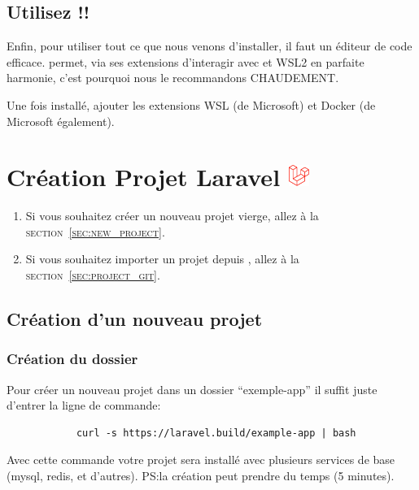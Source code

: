 \documentclass[internal]{nhitec_design}
\begin{document}
    \subsection[VS Code]{Utilisez \vscode!!}
    Enfin, pour utiliser tout ce que nous venons d'installer, il faut un éditeur de code efficace. \href{https://code.visualstudio.com/}{\vscode{}} permet, via ses extensions d'interagir avec \docker{} et WSL2 en parfaite harmonie, c'est pourquoi nous le recommandons CHAUDEMENT. 

    Une fois \vscode{} installé, ajouter les extensions WSL (de Microsoft) et Docker (de Microsoft également).





\newpage
\section[Création Projet Laravel]{Création Projet Laravel \includegraphics[height=20pt]{figures-logos/laravel.pdf}}

\begin{enumerate}
    \item Si vous souhaitez créer un nouveau projet vierge, allez à la \textsc{section~\ref{sec:new_project}}.
    \item Si vous souhaitez importer un projet depuis \github{}, allez à la \textsc{section~\ref{sec:project_git}}.
\end{enumerate}

\subsection[Création d'un nouveau projet]{Création d'un nouveau projet\label{sec:new_project}}
    \subsubsection{Création du dossier}
        Pour créer un nouveau projet \laravel{} dans un dossier ``exemple-app'' il suffit juste d'entrer la ligne de commande:

        \begin{lstlisting}
            curl -s https://laravel.build/example-app | bash
        \end{lstlisting}

        Avec cette commande votre projet sera installé avec plusieurs services de base (mysql, redis, et d'autres). PS:la création peut prendre du temps (5 minutes).
\end{document}
